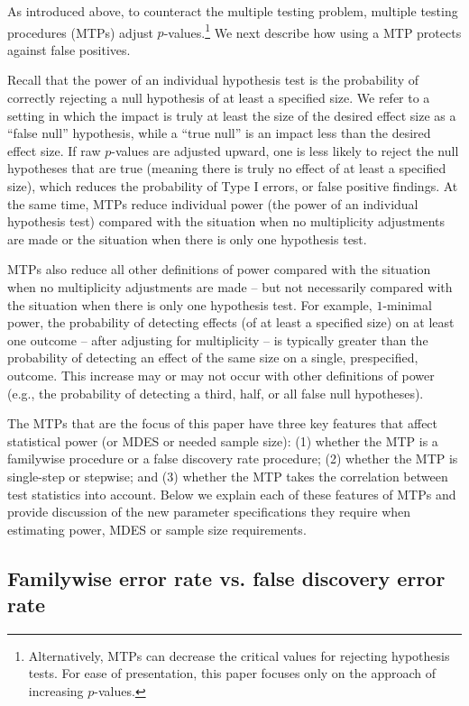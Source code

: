 \documentclass[
]{article}
\begin{document}
As introduced above, to counteract the multiple testing problem,
multiple testing procedures (MTPs) adjust
\(p\)-values.\footnote{Alternatively, MTPs can decrease the critical values for rejecting hypothesis tests. For ease of presentation, this paper focuses only on the approach of increasing $p$-values.}
We next describe how using a MTP protects against false positives.

Recall that the power of an individual hypothesis test is the
probability of correctly rejecting a null hypothesis of at least a
specified size. We refer to a setting in which the impact is truly at
least the size of the desired effect size as a ``false null''
hypothesis, while a ``true null'' is an impact less than the desired
effect size. If raw \(p\)-values are adjusted upward, one is less likely
to reject the null hypotheses that are true (meaning there is truly no
effect of at least a specified size), which reduces the probability of
Type I errors, or false positive findings. At the same time, MTPs reduce
individual power (the power of an individual hypothesis test) compared
with the situation when no multiplicity adjustments are made or the
situation when there is only one hypothesis test.

MTPs also reduce all other definitions of power compared with the
situation when no multiplicity adjustments are made -- but not
necessarily compared with the situation when there is only one
hypothesis test. For example, \(1\)-minimal power, the probability of
detecting effects (of at least a specified size) on at least one outcome
-- after adjusting for multiplicity -- is typically greater than the
probability of detecting an effect of the same size on a single,
prespecified, outcome. This increase may or may not occur with other
definitions of power (e.g., the probability of detecting a third, half,
or all false null hypotheses).

The MTPs that are the focus of this paper have three key features that
affect statistical power (or MDES or needed sample size): (1) whether
the MTP is a familywise procedure or a false discovery rate procedure;
(2) whether the MTP is single-step or stepwise; and (3) whether the MTP
takes the correlation between test statistics into account. Below we
explain each of these features of MTPs and provide discussion of the new
parameter specifications they require when estimating power, MDES or
sample size requirements.

\subsection{Familywise error rate vs. false discovery error rate}
\end{document}
